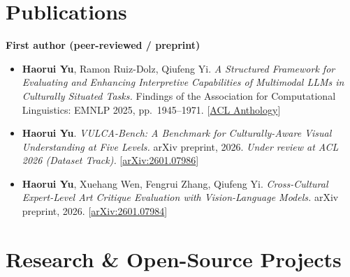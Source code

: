 \documentclass[10.5pt,a4paper]{article}
\newcommand{\pub}[1]{\item #1}
\begin{document}
\section*{Publications}

\textbf{\small First author (peer-reviewed / preprint)}

\begin{itemize}
  \pub{\textbf{Haorui Yu}, Ramon Ruiz-Dolz, Qiufeng Yi.
  \emph{A Structured Framework for Evaluating and Enhancing Interpretive Capabilities of Multimodal LLMs in Culturally Situated Tasks.}
  Findings of the Association for Computational Linguistics: EMNLP 2025, pp.~1945–1971.
  [\href{https://aclanthology.org/2025.findings-emnlp.103/}{ACL Anthology}]}

  \pub{\textbf{Haorui Yu}.
  \emph{VULCA-Bench: A Benchmark for Culturally-Aware Visual Understanding at Five Levels.}
  arXiv preprint, 2026. \emph{Under review at ACL 2026 (Dataset Track).}
  [\href{https://arxiv.org/abs/2601.07986}{arXiv:2601.07986}]}

  \pub{\textbf{Haorui Yu}, Xuehang Wen, Fengrui Zhang, Qiufeng Yi.
  \emph{Cross-Cultural Expert-Level Art Critique Evaluation with Vision-Language Models.}
  arXiv preprint, 2026.
  [\href{https://arxiv.org/abs/2601.07984}{arXiv:2601.07984}]}
\end{itemize}

\section*{Research \& Open-Source Projects}
\end{document}
